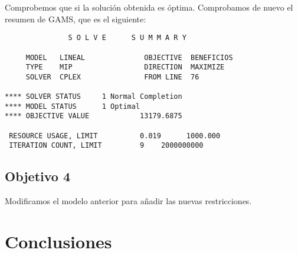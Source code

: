 \documentclass[12pt,a4paper,twoside,openright,titlepage,final]{article}
\begin{document}
Comprobemos que si la solución obtenida es óptima. Comprobamos de nuevo el resumen de GAMS, que es el siguiente:

\begin{verbatim}
               S O L V E      S U M M A R Y

     MODEL   LINEAL              OBJECTIVE  BENEFICIOS
     TYPE    MIP                 DIRECTION  MAXIMIZE
     SOLVER  CPLEX               FROM LINE  76

**** SOLVER STATUS     1 Normal Completion         
**** MODEL STATUS      1 Optimal                   
**** OBJECTIVE VALUE            13179.6875

 RESOURCE USAGE, LIMIT          0.019      1000.000
 ITERATION COUNT, LIMIT         9    2000000000
\end{verbatim}

\subsection{Objetivo 4}

Modificamos el modelo anterior para añadir las nuevas restricciones.\\



\section{Conclusiones}
\end{document}
